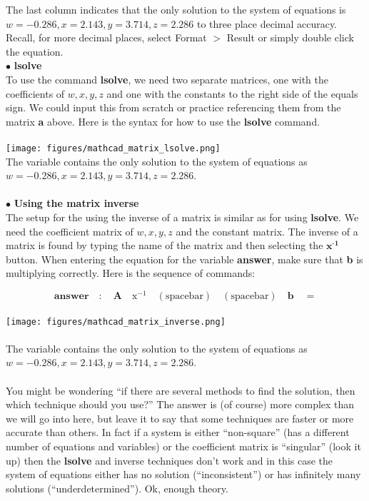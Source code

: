 The last column indicates that the only solution to the system of equations is $w=-0.286, x=2.143, y=3.714 ,z=2.286$ to three place decimal accuracy. Recall, for more decimal places, select Format $>$ Result or simply double click the equation.\\

\newpage
{}
$\bullet$ \textbf{lsolve}\\

To use the command \textbf{lsolve}, we need two separate matrices, one with the coefficients of $w,x,y,z$ and one with the constants to the right side of the equals sign. We could input this from scratch or practice referencing them from the matrix \textbf{a} above.  Here is the syntax for how to use the \textbf{lsolve} command.\\
\\
\texttt{[image: figures/mathcad\_matrix\_lsolve.png]}\\

The variable  contains the only solution to the system of equations as $w=-0.286, x=2.143, y=3.714 ,z=2.286$.\\
\\
$\bullet$ \textbf{Using the matrix inverse}\\

The setup for the using the inverse of a matrix is similar as for using \textbf{lsolve}.  We need the coefficient matrix of $w,x,y,z$ and the constant matrix.  The inverse of a matrix is found by typing the name of the matrix and then selecting the $\textbf{x}^{\textbf{-1}}$ button.  When entering the equation for the variable \textbf{answer}, make sure that \textbf{b} is multiplying correctly.  Here is the sequence of commands:

\[
\textbf{answer} \quad : \quad \textbf{A} \quad \text{x}^{-1} \quad (\text{spacebar}) \quad (\text{spacebar}) \quad \textbf{b} \quad = 
\]
\\
\hspace{-.2in} \texttt{[image: figures/mathcad\_matrix\_inverse.png]}\\
\\
The variable  contains the only solution to the system of equations as $w=-0.286, x=2.143, y=3.714 ,z=2.286$.\\
\\

You might be wondering ``if there are several methods to find the solution, then which technique should you use?''
The answer is (of course) more complex than we will go into here, but leave it to say that some techniques are faster or more accurate than others.  In fact if a system is either ``non-square'' (has a different number of equations and variables) or the coefficient matrix is ``singular'' (look it up) then the \textbf{lsolve} and inverse techniques don't work and in this case the system of equations either has no solution (``inconsistent'') or has infinitely many solutions (``underdetermined'').  Ok, enough theory.  

\newpage
{}

\begin{adjustwidth}{-20pt}{-20pt}%
\sffamily 
{}
\rmfamily
\end{adjustwidth}
